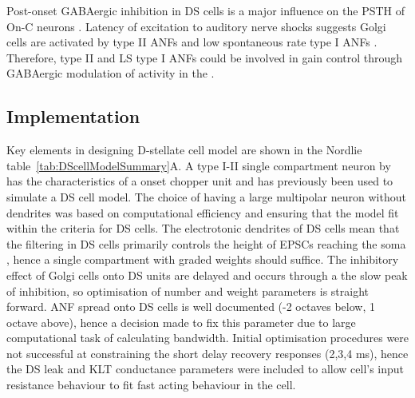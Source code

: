 \smallskip{}

Post-onset GABAergic inhibition in DS cells is a major influence on the PSTH of
On-C neurons \citep{FerragamoGoldingEtAl:1998a,EvansZhao:1998}. Latency of
excitation to auditory nerve shocks suggests Golgi cells are activated by type
II ANFs and low spontaneous rate type I ANFs \citep{BensonBerglundEtAl:1996,
  FerragamoGoldingEtAl:1998}. Therefore, type II and LS type I ANFs could be
involved in gain control through GABAergic modulation of activity in the \VCN.

\smallskip{}





\subsection{Implementation}\label{sec:DS:implementation}
 

Key elements in designing D-stellate cell model are
shown in the Nordlie table~\ref{tab:DScellModelSummary}A. A type I-II single
compartment neuron by \citet{RothmanManis:2003b} has the characteristics of a
onset chopper unit and has previously been used to simulate a DS cell model. The
choice of having a large multipolar neuron without dendrites was based on
computational efficiency and ensuring that the model fit within the criteria for
DS cells. The electrotonic dendrites of DS cells mean that the filtering in DS
cells primarily controls the height of EPSCs reaching the soma
\citep{WhiteYoungEtAl:1994}, hence a single compartment with graded weights
should suffice. The inhibitory effect of Golgi cells onto DS units are delayed and occurs
through a the slow peak of \GABAa inhibition, so optimisation of number and
weight parameters is straight forward. ANF spread onto DS cells is well
documented (-2 octaves below, 1 octave above), hence a decision made to fix this
parameter due to large computational task of calculating bandwidth. Initial
optimisation procedures were not successful at constraining the short delay
recovery responses (2,3,4 ms), hence the DS leak and KLT conductance parameters
were included to allow cell's input resistance behaviour to fit fast acting
behaviour in the cell.

